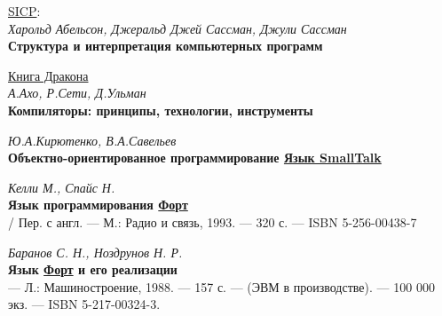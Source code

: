 \begin{thebibliography}{99}

 \href{http://newstar.rinet.ru/~goga/sicp/sicp.pdf}{SICP}:
\\
\textit{Харольд Абельсон,
Джеральд Джей Сассман,
Джули Сассман}
\\
\textbf{Структура и интерпретация компьютерных программ}

 \href{https://drive.google.com/file/d/0B0u4WeMjO894UXQ5dV9lZHZnWVE/view?usp=sharing}{Книга Дракона}
\\
\textit{А.Ахо, Р.Сети, Д.Ульман}
\\
\textbf{Компиляторы: принципы, технологии, инструменты} 

\textit{Ю.А.Кирютенко, В.А.Савельев}
\\
\textbf{Объектно-ориентированное программирование
\href{https://drive.google.com/file/d/0B0u4WeMjO894T1hjZ2xpcmZvdlU/view?usp=sharing}{Язык SmallTalk}
}

\textit{Келли М., Спайс Н.}
\\
\textbf{Язык программирования \href{http://www.forth.org.ru/forth/lit.html}{Форт}}
\\
/ Пер. с англ. — М.: Радио и связь, 1993. — 320 с. — ISBN 5-256-00438-7

\textit{Баранов С. Н., Ноздрунов Н. Р.}
\\
\textbf{Язык \href{http://www.forth.org.ru/forth/lit.html}{Форт} и его реализации}
\\
— Л.: Машиностроение, 1988. — 157 с. — (ЭВМ в производстве). — 100 000 экз. — ISBN 5-217-00324-3.

\end{thebibliography}
